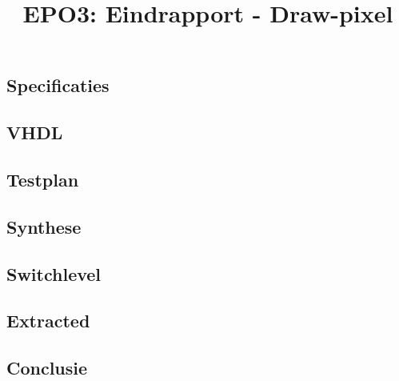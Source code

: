 \documentclass{scrartcl} %
\author{}%
\title{EPO3: Eindrapport - Draw-pixel}
\begin{document}
\section{} %
\label{sec:} %


\subsection{Specificaties}


\subsection{VHDL}


\subsection{Testplan}


\subsection{Synthese}


\subsection{Switchlevel}


\subsection{Extracted}

\subsection{Conclusie}
\end{document}
